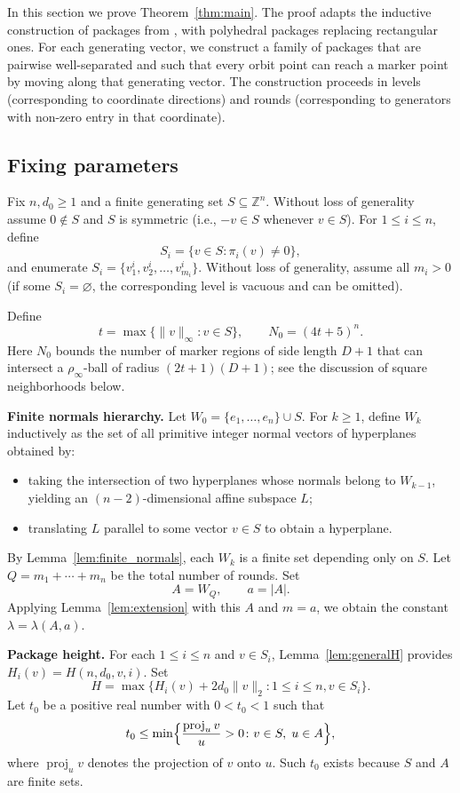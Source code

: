 \documentclass[10pt,a4paper]{amsart}
\DeclareMathOperator{\proj}{proj}
\begin{document}
In this section we prove Theorem~\ref{thm:main}. The proof adapts the
inductive construction of packages from \cite{GW25}, with polyhedral
packages replacing rectangular ones. For each generating vector, we
construct a family of packages that are pairwise well-separated and such
that every orbit point can reach a marker point by moving along that
generating vector. The construction proceeds in levels (corresponding
to coordinate directions) and rounds (corresponding to generators with
non-zero entry in that coordinate).

\subsection{Fixing parameters}

Fix $n, d_0\geq 1$ and a finite generating set $S\subseteq\mathbb{Z}^n$.
Without loss of generality assume $0\notin S$ and $S$ is symmetric
(i.e., $-v\in S$ whenever $v\in S$). For $1\leq i\leq n$, define
\[
S_i=\{v\in S\colon \pi_i(v)\neq 0\},
\]
and enumerate $S_i=\{v_1^i, v_2^i, \dots, v_{m_i}^i\}$. Without loss of
generality, assume all $m_i>0$ (if some $S_i=\varnothing$, the corresponding
level is vacuous and can be omitted).

Define
\[
t=\max\{\|v\|_{\infty}\colon v\in S\},\qquad
N_0=(4t+5)^n.
\]
Here $N_0$ bounds the number of marker regions of side length $D+1$
that can intersect a $\rho_\infty$-ball of radius $(2t+1)(D+1)$; see the
discussion of square neighborhoods below.

\medskip\noindent
\textbf{Finite normals hierarchy.}
Let $W_0=\{e_1,\dots,e_n\}\cup S$. For $k\geq 1$, define $W_k$ inductively
as the set of all primitive integer normal vectors of hyperplanes obtained
by:
\begin{itemize}
\item taking the intersection of two hyperplanes whose normals belong to
$W_{k-1}$, yielding an $(n-2)$-dimensional affine subspace $L$;
\item translating $L$ parallel to some vector $v\in S$ to obtain a hyperplane.
\end{itemize}
By Lemma~\ref{lem:finite_normals}, each $W_k$ is a finite set depending
only on $S$. Let $Q=m_1+\cdots+m_n$ be the total number of rounds. Set
\[
A=W_Q,\qquad a=|A|.
\]
Applying Lemma~\ref{lem:extension} with this $A$ and $m=a$, we obtain
the constant $\lambda=\lambda(A,a)$.

\medskip\noindent
\textbf{Package height.}
For each $1\leq i\leq n$ and $v\in S_i$,
Lemma~\ref{lem:generalH} provides $H_i(v)=H(n,d_0,v,i)$. Set
\[
H=\max\{H_i(v)+2d_0\|v\|_2\colon 1\leq i\leq n, v\in S_i\}.
\]
Let $t_0$ be a positive real number with $0<t_0<1$ such that
\[
t_0\leq \min\Bigl\{\frac{\proj_u v}{u}>0\colon
v\in S,\; u\in A\Bigr\},
\]
where $\proj_u v$ denotes the projection of $v$ onto $u$. Such $t_0$
exists because $S$ and $A$ are finite sets.
\end{document}
